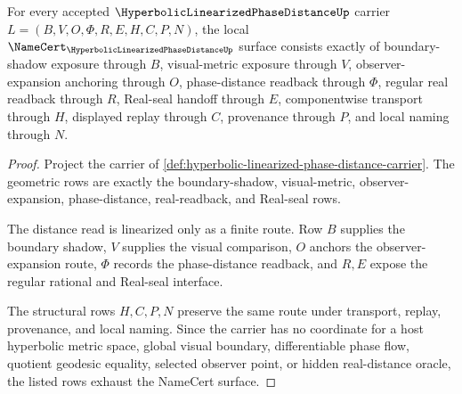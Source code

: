 \begin{theorem}
\label{thm:hyperbolic-linearized-phase-distance-namecert-obligations}
For every accepted $\HyperbolicLinearizedPhaseDistanceUp$ carrier $L=(B,V,O,\Phi,R,E,H,C,P,N)$, the local $\NameCert_{\HyperbolicLinearizedPhaseDistanceUp}$ surface consists exactly of boundary-shadow exposure through $B$, visual-metric exposure through $V$, observer-expansion anchoring through $O$, phase-distance readback through $\Phi$, regular real readback through $R$, Real-seal handoff through $E$, componentwise transport through $H$, displayed replay through $C$, provenance through $P$, and local naming through $N$.
\end{theorem}
\begin{proof}
Project the carrier of \autoref{def:hyperbolic-linearized-phase-distance-carrier}. The geometric rows are exactly the boundary-shadow, visual-metric, observer-expansion, phase-distance, real-readback, and Real-seal rows.

The distance read is linearized only as a finite route. Row $B$ supplies the boundary shadow, $V$ supplies the visual comparison, $O$ anchors the observer-expansion route, $\Phi$ records the phase-distance readback, and $R,E$ expose the regular rational and Real-seal interface.

The structural rows $H,C,P,N$ preserve the same route under transport, replay, provenance, and local naming. Since the carrier has no coordinate for a host hyperbolic metric space, global visual boundary, differentiable phase flow, quotient geodesic equality, selected observer point, or hidden real-distance oracle, the listed rows exhaust the NameCert surface.
\end{proof}

